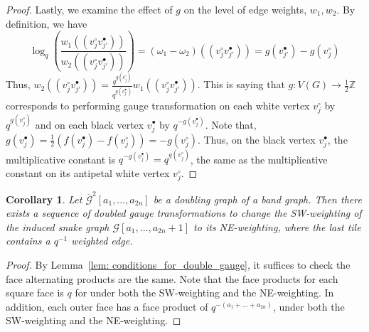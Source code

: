 \documentclass[11pt]{amsart}
\newtheorem{cor}[thm]{Corollary}
\theoremstyle{definition}
\theoremstyle{remark}
\numberwithin{equation}{section}
\begin{document}
\begin{proof}
    Lastly, we examine the effect of $g$ on the level of edge weights, $w_1,w_2$. By definition, we have $$\log_q(\frac{w_1((v^\circ_jv^\bullet_{j'}))}{w_2((v^\circ_jv^\bullet_{j'}))}) = (\omega_1-\omega_2)((v^\circ_jv^\bullet_{j'})) = g(v^\bullet_{j'})-g(v^\circ_j)$$ Thus, $w_2((v^\circ_jv^\bullet_{j'})) = \displaystyle\frac{q^{g(v^\circ_j)}}{q^{g(v^\bullet_{j'})}}w_1((v^\circ_jv^\bullet_{j'}))$. This is saying that $g: V(G)\rightarrow \frac{1}{2}\mathbb{Z}$ corresponds to performing gauge transformation on each white vertex $v^\circ_j$ by $q^{g(v^\circ_j)}$ and on each black vertex $v^\bullet_j$ by $q^{-g(v^\bullet_j)}$. Note that, $g(v^\bullet_j) = \frac{1}{2}(f(v^\bullet_j)-f(v^\circ_j)) = -g(v^\circ_j)$. Thus, on the black vertex $v^\bullet_j$, the multiplicative constant is $q^{-g(v^\bullet_j)} = q^{g(v^\circ_j)}$, the same as the multiplicative constant on its antipetal white vertex $v^\circ_j$.
\end{proof}

\begin{cor}\label{cor:SW_to_NE_weights}
    Let $\overline{\mathcal{G}}^2[a_1,...,a_{2n}]$ be a doubling graph of a band graph. Then there exists a sequence of doubled gauge transformations to change the SW-weighting of the induced snake graph $\mathcal{G}[a_1,...,a_{2n}+1]$ to its NE-weighting, where the last tile contains a $q^{-1}$ weighted edge. 
\end{cor}
\begin{proof}
    By Lemma~\ref{lem: conditions_for_double_gauge}, it suffices to check the face alternating products are the same. Note that the face products for each square face is $q$ for under both the SW-weighting and the NE-weighting. In addition, each outer face has a face product of $q^{-(a_1+...+a_{2n})}$, under both the SW-weighting and the NE-weighting.
\end{proof}
\end{document}
